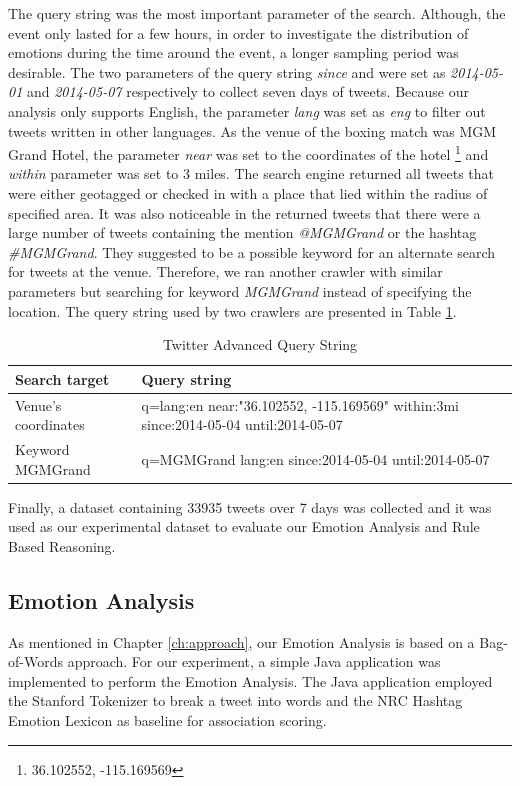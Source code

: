The query string was the most important parameter of the search. Although, the event only lasted for a few hours, in order to investigate the distribution of emotions during the time around the event, a longer sampling period was desirable. The two parameters of the query string \textit{since} and  were set as \textit{2014-05-01} and \textit{2014-05-07} respectively to collect seven days of tweets. Because our analysis only supports English, the parameter \textit{lang} was set as \textit{eng} to filter out tweets written in other languages. As the venue of the boxing match was MGM Grand Hotel, the parameter \textit{near} was set to the coordinates of the hotel \footnote{36.102552, -115.169569} and \textit{within} parameter was set to 3 miles. The search engine returned all tweets that were either geotagged or checked in with a place that lied within the radius of specified area. It was also noticeable in the returned tweets that there were a large number of tweets containing the mention \textit{@MGMGrand} or the hashtag \textit{\#MGMGrand}. They suggested to be a possible keyword for an alternate search for tweets at the venue. Therefore, we ran another crawler with similar parameters but searching for keyword \textit{MGMGrand} instead of specifying the location. The query string used by two crawlers are presented in Table \ref{table:crawlerURL}. 

\begin{table}
\caption{Twitter Advanced Query String}
\label{table:crawlerURL}
\centering
\begin{tabular}{|p{4cm}|p{10cm}|}

\hline
\textbf{Search target} & \textbf{Query string} \\ \hline \hline
Venue's coordinates & q=lang:en near:"36.102552, -115.169569" within:3mi since:2014-05-04 until:2014-05-07 \\ \hline
Keyword MGMGrand & q=MGMGrand lang:en since:2014-05-04 until:2014-05-07 \\ \hline

\end{tabular}
\end{table}

Finally, a dataset containing 33935 tweets over 7 days was collected and it was used as our experimental dataset to evaluate our Emotion Analysis and Rule Based Reasoning.

\subsection{Emotion Analysis}
As mentioned in Chapter \ref{ch:approach}, our Emotion Analysis is based on a Bag-of-Words approach. For our experiment, a simple Java application was implemented to perform the Emotion Analysis. The Java application employed the Stanford Tokenizer to break a tweet into words and the NRC Hashtag Emotion Lexicon as baseline for association scoring.

